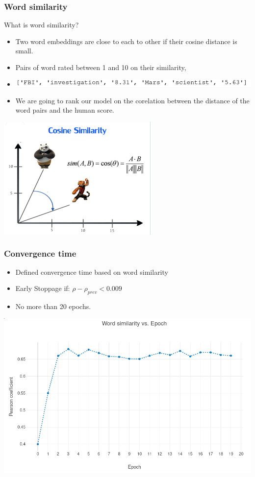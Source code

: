 \begin{frame}
\frametitle{Word similarity}
\begin{Large}
What is word similarity? 
\end{Large}
\medskip
\begin{itemize}
\item Two word embeddings are close to each to other if their cosine distance is small. 
\item Pairs of word rated between 1 and 10 on their similarity, 
\item \includegraphics[scale=0.5]{images/wordsim353_example}
\item We are going to rank our model on the corelation between the distance of the word pairs and the human score.
\end{itemize}
\centerline{ \includegraphics[scale=0.4]{images/cosine}}
\end{frame}
\begin{frame}
\frametitle{Convergence time}
\begin{itemize}
\item Defined convergence time based on word similarity
\item Early Stoppage if: $ \rho -  \rho_{prev} < 0.009$ 
\item No more than 20 epochs. 
\end{itemize}
\includegraphics[scale=0.3]{images/wordsim_convergence}
\end{frame}
